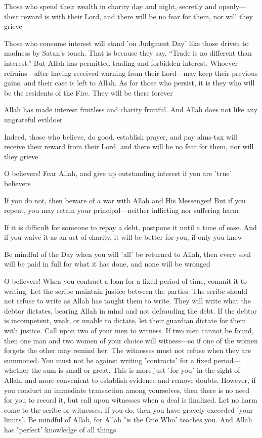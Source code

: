 Those who spend their wealth in charity day and night, secretly and openly—their reward is with their Lord, and there will be no fear for them, nor will they grieve

Those who consume interest will stand ˹on Judgment Day˺ like those driven to madness by Satan’s touch. That is because they say, “Trade is no different than interest.” But Allah has permitted trading and forbidden interest. Whoever refrains—after having received warning from their Lord—may keep their previous gains, and their case is left to Allah. As for those who persist, it is they who will be the residents of the Fire. They will be there forever

Allah has made interest fruitless and charity fruitful. And Allah does not like any ungrateful evildoer

Indeed, those who believe, do good, establish prayer, and pay alms-tax will receive their reward from their Lord, and there will be no fear for them, nor will they grieve

O believers! Fear Allah, and give up outstanding interest if you are ˹true˺ believers

If you do not, then beware of a war with Allah and His Messenger! But if you repent, you may retain your principal—neither inflicting nor suffering harm

If it is difficult for someone to repay a debt, postpone it until a time of ease. And if you waive it as an act of charity, it will be better for you, if only you knew

Be mindful of the Day when you will ˹all˺ be returned to Allah, then every soul will be paid in full for what it has done, and none will be wronged

O believers! When you contract a loan for a fixed period of time, commit it to writing. Let the scribe maintain justice between the parties. The scribe should not refuse to write as Allah has taught them to write. They will write what the debtor dictates, bearing Allah in mind and not defrauding the debt. If the debtor is incompetent, weak, or unable to dictate, let their guardian dictate for them with justice. Call upon two of your men to witness. If two men cannot be found, then one man and two women of your choice will witness—so if one of the women forgets the other may remind her. The witnesses must not refuse when they are summoned. You must not be against writing ˹contracts˺ for a fixed period—whether the sum is small or great. This is more just ˹for you˺ in the sight of Allah, and more convenient to establish evidence and remove doubts. However, if you conduct an immediate transaction among yourselves, then there is no need for you to record it, but call upon witnesses when a deal is finalized. Let no harm come to the scribe or witnesses. If you do, then you have gravely exceeded ˹your limits˺. Be mindful of Allah, for Allah ˹is the One Who˺ teaches you. And Allah has ˹perfect˺ knowledge of all things

